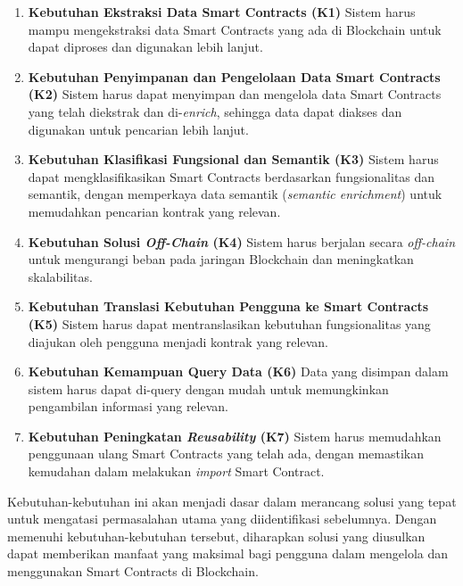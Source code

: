 \begin{enumerate}
	\item \textbf{Kebutuhan Ekstraksi Data Smart Contracts (K1)} \newline
	      Sistem harus mampu mengekstraksi data Smart Contracts yang ada di Blockchain untuk dapat diproses dan digunakan lebih lanjut.

	\item \textbf{Kebutuhan Penyimpanan dan Pengelolaan Data Smart Contracts (K2)} \newline
	      Sistem harus dapat menyimpan dan mengelola data Smart Contracts yang telah diekstrak dan di-\textit{enrich}, sehingga data dapat diakses dan digunakan untuk pencarian lebih lanjut.

	\item \textbf{Kebutuhan Klasifikasi Fungsional dan Semantik (K3)} \newline
	      Sistem harus dapat mengklasifikasikan Smart Contracts berdasarkan fungsionalitas dan semantik, dengan memperkaya data semantik (\textit{semantic enrichment}) untuk memudahkan pencarian kontrak yang relevan.

	\item \textbf{Kebutuhan Solusi \textit{Off-Chain} (K4)} \newline
	      Sistem harus berjalan secara \textit{off-chain} untuk mengurangi beban pada jaringan Blockchain dan meningkatkan skalabilitas.

	\item \textbf{Kebutuhan Translasi Kebutuhan Pengguna ke Smart Contracts (K5)} \newline
	      Sistem harus dapat mentranslasikan kebutuhan fungsionalitas yang diajukan oleh pengguna menjadi kontrak yang relevan.

	\item \textbf{Kebutuhan Kemampuan Query Data (K6)} \newline
	      Data yang disimpan dalam sistem harus dapat di-query dengan mudah untuk memungkinkan pengambilan informasi yang relevan.

	\item \textbf{Kebutuhan Peningkatan \textit{Reusability} (K7)} \newline
	      Sistem harus memudahkan penggunaan ulang Smart Contracts yang telah ada, dengan memastikan kemudahan dalam melakukan \textit{import} Smart Contract.
\end{enumerate}

Kebutuhan-kebutuhan ini akan menjadi dasar dalam merancang solusi yang tepat untuk mengatasi permasalahan utama yang diidentifikasi sebelumnya. Dengan memenuhi kebutuhan-kebutuhan tersebut, diharapkan solusi yang diusulkan dapat memberikan manfaat yang maksimal bagi pengguna dalam mengelola dan menggunakan Smart Contracts di Blockchain.

